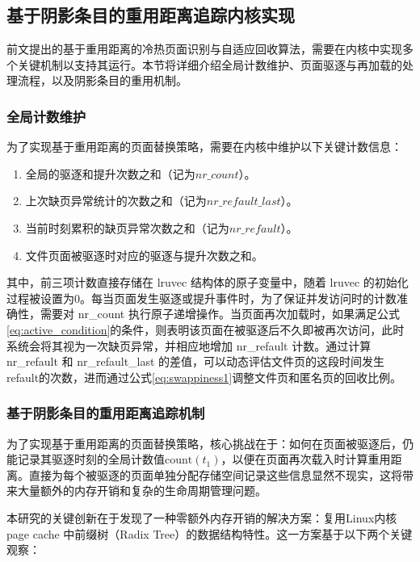 \subsection{基于阴影条目的重用距离追踪内核实现}
\label{sec:shadow_entry_impl}

前文提出的基于重用距离的冷热页面识别与自适应回收算法，需要在内核中实现多个关键机制以支持其运行。本节将详细介绍全局计数维护、页面驱逐与再加载的处理流程，以及阴影条目的重用机制。

\subsubsection{全局计数维护}

为了实现基于重用距离的页面替换策略，需要在内核中维护以下关键计数信息：

\begin{enumerate}
  \item 全局的驱逐和提升次数之和（记为\(nr\_count\)）。
  \item 上次缺页异常统计的次数之和（记为\(nr\_refault\_last\)）。
  \item 当前时刻累积的缺页异常次数之和（记为\(nr\_refault\)）。
  \item 文件页面被驱逐时对应的驱逐与提升次数之和。
\end{enumerate}

其中，前三项计数直接存储在 lruvec 结构体的原子变量中，随着 lruvec 的初始化过程被设置为0。每当页面发生驱逐或提升事件时，为了保证并发访问时的计数准确性，需要对 nr\_count 执行原子递增操作。当页面再次加载时，如果满足公式\ref{eq:active_condition}的条件，则表明该页面在被驱逐后不久即被再次访问，此时系统会将其视为一次缺页异常，并相应地增加 nr\_refault 计数。通过计算 nr\_refault 和 nr\_refault\_last 的差值，可以动态评估文件页的这段时间发生refault的次数，进而通过公式\ref{eq:swappiness1}调整文件页和匿名页的回收比例。

\subsubsection{基于阴影条目的重用距离追踪机制}
\label{sec:shadow_entry}
为了实现基于重用距离的页面替换策略，核心挑战在于：如何在页面被驱逐后，仍能记录其驱逐时刻的全局计数值\(\mathrm{count}(t_1)\)，以便在页面再次载入时计算重用距离。直接为每个被驱逐的页面单独分配存储空间记录这些信息显然不现实，这将带来大量额外的内存开销和复杂的生命周期管理问题。

本研究的关键创新在于发现了一种零额外内存开销的解决方案：复用Linux内核 page cache 中前缀树（Radix Tree）的数据结构特性。这一方案基于以下两个关键观察：


